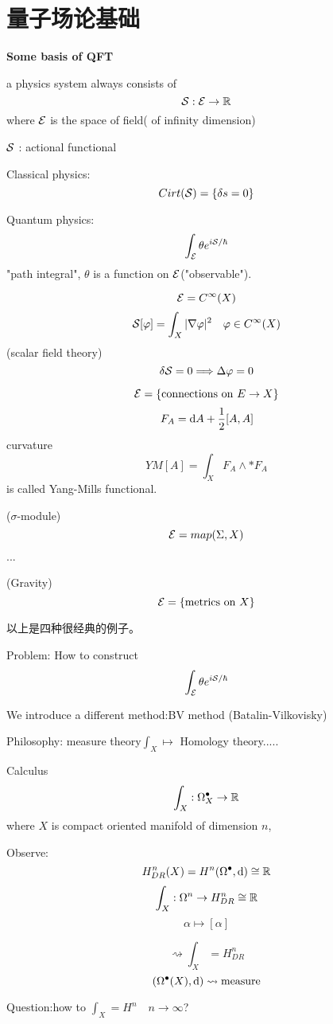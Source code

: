 \section{量子场论基础}
\textbf{Some basis of QFT}

a physics system always consists of
$$\mathcal{S}:\mathcal{E}\to\mathbb{R}$$
where $\mathcal{E}$ is the space of field( of infinity dimension)

$\mathcal{S}$ : actional functional%

Classical physics:
$$Cirt(\mathcal{S})=\{\delta s=0\}$$

Quantum physics:
$$\int_{\mathcal{E}}\theta e^{i\mathcal{S}/\hbar}$$
"path integral", $\theta$ is a function on $\mathcal{E}$("observable").

\begin{example}
$$\mathcal{E}= C^{\infty}(X)$$
$$\mathcal{S}[\varphi]=\int_X|\nabla\varphi|^2\quad\varphi\in C^{\infty}(X)$$
(scalar field theory)
$$\delta\mathcal{S}=0\Longrightarrow\Delta\varphi=0$$
\end{example}

\begin{example}
$$\mathcal{E}=\{\text{connections on $E\to X$}\}$$
$$F_A=\mathrm{d} A+\frac{1}{2}[A,A]$$
curvature
$$YM[A]=\int_XF_A\wedge*F_A$$
is called Yang-Mills functional.
\end{example}

\begin{example}($\sigma$-module)
$$\mathcal{E}=map(\Sigma,X)$$
...
\end{example}

\begin{example}(Gravity)
$$\mathcal{E}=\{\text{metrics on $X$}\}$$
\end{example}
以上是四种很经典的例子。

Problem: How to construct
$$\int_{\mathcal{E}}\theta e^{i\mathcal{S}/\hbar}$$

We introduce a different method:BV method
(Batalin-Vilkovisky)

Philosophy: measure theory$\int_X\mapsto$ Homology theory.....

Calculus
$$\int_X:\Omega_X^{\bullet}\to\mathbb{R}$$
where $X$ is compact oriented manifold of dimension $n$,

Observe:
$$H^n_{DR}(X)=H^n(\Omega^{\bullet},\mathrm{d})\cong\mathbb{R}$$
$$\int_X:\Omega^n\to H^n_{DR}\cong\mathbb{R}$$
$$\alpha\mapsto[\alpha]$$

$$\rightsquigarrow\int_X=H_{DR}^n$$
$$(\Omega^{\bullet}(X),\mathrm{d})\rightsquigarrow\text{measure}$$

Question:how to $\int_X=H^n\quad n\to\infty$?

